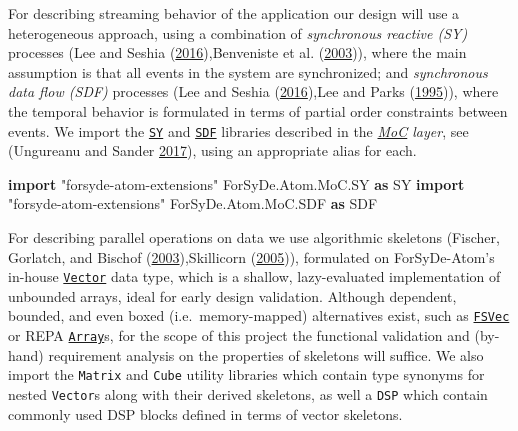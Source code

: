 \documentclass[
  a4paper,
]{article}
\newenvironment{Shaded}{}{}
\newcommand{\DataTypeTok}[1]{\textcolor[rgb]{0.56,0.13,0.00}{#1}}
\newcommand{\KeywordTok}[1]{\textcolor[rgb]{0.00,0.44,0.13}{\textbf{#1}}}
\newcommand{\NormalTok}[1]{#1}
\begin{document}
For describing streaming behavior of the application our design will use
a heterogeneous approach, using a combination of \emph{synchronous
reactive (SY)} processes (Lee and Seshia
(\protect\hyperlink{ref-leeseshia-15}{2016}),Benveniste et al.
(\protect\hyperlink{ref-Benveniste03}{2003})), where the main assumption
is that all events in the system are synchronized; and \emph{synchronous
data flow (SDF)} processes (Lee and Seshia
(\protect\hyperlink{ref-leeseshia-15}{2016}),Lee and Parks
(\protect\hyperlink{ref-lee95}{1995})), where the temporal behavior is
formulated in terms of partial order constraints between events. We
import the
\href{https://forsyde.github.io/forsyde-atom/api/ForSyDe-Atom-MoC-SY.html}{\texttt{SY}}
and
\href{https://forsyde.github.io/forsyde-atom/api/ForSyDe-Atom-MoC-SDF.html}{\texttt{SDF}}
libraries described in the
\emph{\href{https://forsyde.github.io/forsyde-atom/api/ForSyDe-Atom-MoC.html}{MoC}
layer}, see (Ungureanu and Sander
\protect\hyperlink{ref-ungureanu17}{2017}), using an appropriate alias
for each.

\begin{Shaded}
\begin{Highlighting}[numbers=left,,firstnumber=57,]
\KeywordTok{import}\NormalTok{ "forsyde-atom-extensions" }\DataTypeTok{ForSyDe.Atom.MoC.SY}  \KeywordTok{as} \DataTypeTok{SY}
\KeywordTok{import}\NormalTok{ "forsyde-atom-extensions" }\DataTypeTok{ForSyDe.Atom.MoC.SDF} \KeywordTok{as} \DataTypeTok{SDF}
\end{Highlighting}
\end{Shaded}

For describing parallel operations on data we use algorithmic skeletons
(Fischer, Gorlatch, and Bischof
(\protect\hyperlink{ref-Fischer-2003}{2003}),Skillicorn
(\protect\hyperlink{ref-skillicorn05}{2005})), formulated on
ForSyDe-Atom's in-house
\href{http://hackage.haskell.org/package/forsyde-shallow/docs/ForSyDe-Shallow-Core-Vector.html}{\texttt{Vector}}
data type, which is a shallow, lazy-evaluated implementation of
unbounded arrays, ideal for early design validation. Although dependent,
bounded, and even boxed (i.e.~memory-mapped) alternatives exist, such as
\href{http://hackage.haskell.org/package/parameterized-data/docs/Data-Param-FSVec.html}{\texttt{FSVec}}
or REPA \href{http://hackage.haskell.org/package/repa}{\texttt{Array}}s,
for the scope of this project the functional validation and (by-hand)
requirement analysis on the properties of skeletons will suffice. We
also import the \texttt{Matrix} and \texttt{Cube} utility libraries
which contain type synonyms for nested \texttt{Vector}s along with their
derived skeletons, as well a \texttt{DSP} which contain commonly used
DSP blocks defined in terms of vector skeletons.
\end{document}
